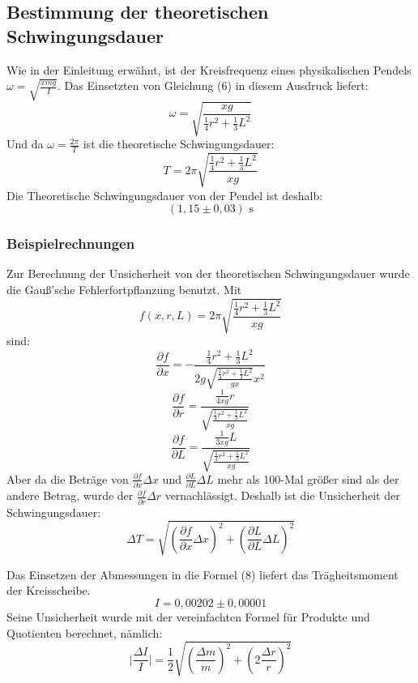 \documentclass[11pt,a4paper]{article} %
\begin{document}
\subsection{Bestimmung der theoretischen Schwingungsdauer}
Wie in der Einleitung erwähnt, ist der Kreisfrequenz eines physikalischen Pendels $\omega = \sqrt{\frac{xmg}{I}}$. Das Einsetzten von Gleichung (6) in diesem Ausdruck liefert:
$$\omega = \sqrt{\frac{xg}{\frac{1}{4}r^2+\frac{1}{3}L^2}}$$
Und da $\omega = \frac{2\pi}{T}$ ist die theoretische Schwingungsdauer:
$$T = 2\pi \sqrt{\frac{\frac{1}{4}r^2+\frac{1}{3}L^2}{xg}}$$
Die Theoretische Schwingungsdauer von der Pendel ist deshalb:
$$(1,15\pm 0,03) \textrm{ s}$$
\begin{tcolorbox}[colback=white]
	\subsubsection{Beispielrechnungen}
	Zur Berechnung der Unsicherheit von der theoretischen Schwingungsdauer wurde die Gauß'sche Fehlerfortpflanzung benutzt. Mit
	$$f(x,r,L) = 2\pi \sqrt{\frac{\frac{1}{4}r^2+\frac{1}{3}L^2}{xg}}$$
	sind:
	$$\frac{\partial f}{\partial x} = -\frac{\frac{1}{4}r^2+\frac{1}{3}L^2}{2g\sqrt{\frac{\frac{1}{4}r^2+\frac{1}{3}L^2}{gx}}x^2} $$
	$$\frac{\partial f}{\partial r} = \frac{\frac{1}{4xg}r}{\sqrt{\frac{\frac{1}{4}r^2+\frac{1}{3}L^2}{xg}}}$$
	$$\frac{\partial f}{\partial L} = \frac{\frac{1}{3xg}L}{\sqrt{\frac{\frac{1}{4}r^2+\frac{1}{3}L^2}{xg}}}$$
	Aber da die Beträge von $\frac{ \partial f}{\partial x} \Delta x$ und $\frac{\partial L}{\partial L} \Delta L$ mehr als 100-Mal größer sind als der andere Betrag, wurde der $\frac{ \partial f}{\partial r} \Delta r$ vernachlässigt. Deshalb ist die Unsicherheit der Schwingungsdauer:
	$$\Delta T = \sqrt{ 
		(\frac{ \partial f}{\partial x} \Delta x)^2
		+(\frac{\partial L}{\partial L} \Delta L)^2
	}
	$$
	
\end{tcolorbox}

Das Einsetzen der Abmessungen in die Formel (8) liefert das Trägheitsmoment der Kreisscheibe. 
$$ I = 0,00202 \pm 0,00001$$
Seine Unsicherheit wurde mit der vereinfachten Formel für Produkte und Quotienten berechnet, nämlich:
$$\vert\frac{\Delta I}{I}\vert = \frac{1}{2}\sqrt{(\frac{\Delta m}{m})^2+(2\frac{\Delta r}{r})^2}$$
\end{document}
